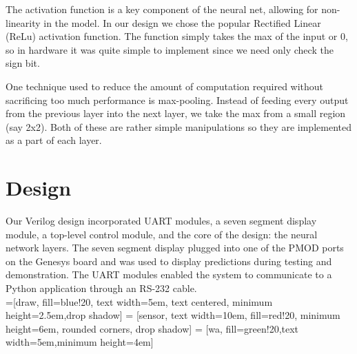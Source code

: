 \documentclass[11pt]{article}
\begin{document}
The activation function is a key component of the neural net, allowing for non-linearity in the model. In our design we chose the popular Rectified Linear (ReLu) activation function. The function simply takes the max of the input or 0, so in hardware it was quite simple to implement since we need only check the sign bit. 

One technique used to reduce the amount of computation required without sacrificing too much performance is max-pooling. Instead of feeding every output from the previous layer into the next layer, we take the max from a small region (say 2x2). Both of these are rather simple manipulations so they are implemented as a part of each layer. 

\section{Design}

Our Verilog design incorporated UART modules, a seven segment display module, a top-level control module, and the core of the design: the neural network layers. The seven segment display plugged into one of the PMOD ports on the Genesys board and was used to display predictions during testing and demonstration. The UART modules enabled the system to communicate to a Python application through an RS-232 cable. \\
 
=[draw, fill=blue!20, text width=5em, 
text centered, minimum height=2.5em,drop shadow]
 = [sensor, text width=10em, fill=red!20, 
minimum height=6em, rounded corners, drop shadow]
 = [wa, fill=green!20,text width=5em,minimum height=4em]
\end{document}
